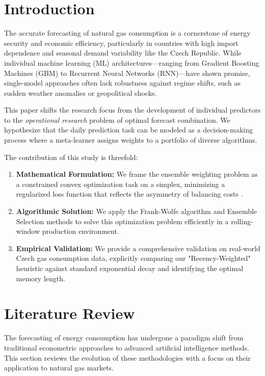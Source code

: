 \documentclass[journal,article,submit,pdftex,moreauthors]{Definitions/mdpi}
\begin{document}
\section{Introduction}

The accurate forecasting of natural gas consumption is a cornerstone of energy security and economic efficiency, particularly in countries with high import dependence and seasonal demand variability like the Czech Republic. While individual machine learning (ML) architectures—ranging from Gradient Boosting Machines (GBM) \citep{ref_xgboost} to Recurrent Neural Networks (RNN)—have shown promise, single-model approaches often lack robustness against regime shifts, such as sudden weather anomalies or geopolitical shocks.

This paper shifts the research focus from the development of individual predictors to the \textit{operational research} problem of optimal forecast combination. We hypothesize that the daily prediction task can be modeled as a decision-making process where a meta-learner assigns weights to a portfolio of diverse algorithms.

The contribution of this study is threefold:
\begin{enumerate}
    \item \textbf{Mathematical Formulation:} We frame the ensemble weighting problem as a constrained convex optimization task on a simplex, minimizing a regularized loss function that reflects the asymmetry of balancing costs \citep{ref_boyd}.
    \item \textbf{Algorithmic Solution:} We apply the Frank-Wolfe algorithm \citep{ref_fw_jaggi} and Ensemble Selection methods \citep{ref_caruana} to solve this optimization problem efficiently in a rolling-window production environment.
    \item \textbf{Empirical Validation:} We provide a comprehensive validation on real-world Czech gas consumption data, explicitly comparing our "Recency-Weighted" heuristic against standard exponential decay and identifying the optimal memory length.
\end{enumerate}

\section{Literature Review}

The forecasting of energy consumption has undergone a paradigm shift from traditional econometric approaches to advanced artificial intelligence methods. This section reviews the evolution of these methodologies with a focus on their application to natural gas markets.
\end{document}

